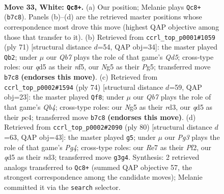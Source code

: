 \documentclass[11pt]{article}
\begin{document}
\clearpage

\begin{figure}[p]\centering
\begin{subfigure}{0.46\textwidth}\centering
\resizebox{\linewidth}{!}{%
\newchessgame
\chessboard[
  setfen={7k/1Q2R3/6p1/3q1pNp/3p3P/3P2P1/5P2/rN4K1 w - - 1 33},
  showmover=false,
  pgfstyle=straightmove, color=movearrow, markmove={b7-c8}
]}
\caption{}
\end{subfigure}\hfill
\begin{subfigure}{0.46\textwidth}\centering
\resizebox{\linewidth}{!}{%
\newchessgame
\chessboard[
  setfen={3r1k2/2p2p2/7p/p4NpP/P2q1nP1/5Q2/5P1K/4R3 b - - 1 36},
  showmover=false,
  pgfstyle=straightmove, color=movearrow, markmove={d4-b2}
]}
\caption{}
\end{subfigure}
\\[4pt]
\begin{subfigure}{0.46\textwidth}\centering
\resizebox{\linewidth}{!}{%
\newchessgame
\chessboard[
  setfen={8/1q5k/4p3/1N3p1n/PQp2P1p/3rP3/1P3K1P/6R1 w - - 6 38},
  showmover=false,
  pgfstyle=straightmove, color=movearrow, markmove={b4-f8}
]}
\caption{}
\end{subfigure}\hfill
\begin{subfigure}{0.46\textwidth}\centering
\resizebox{\linewidth}{!}{%
\newchessgame
\chessboard[
  setfen={7k/6p1/7p/pp1q4/4N1PP/P2n1Q2/5P1K/8 w - - 5 41},
  showmover=false,
  pgfstyle=straightmove, color=movearrow, markmove={g4-g5}
]}
\caption{}
\end{subfigure}
\caption{\textbf{Move 33, White: \texttt{Qc8+}.} (a) Our position; Melanie plays \texttt{Qc8+} (\texttt{b7c8}). Panels (b)--(d) are the retrieved master positions whose correspondence most drove this move (highest QAP objective among those that transfer to it). (b) Retrieved from \texttt{ccrl\_top\_p0001\#1059} (ply 71) [structural distance $d$=54, QAP obj=34]: the master played \texttt{Qb2}; under $\mu$ our \emph{Qb7} plays the role of that game's \emph{Qd5}; cross-type roles: our \emph{q}d5 as their \emph{n}f5, our \emph{N}g5 as their \emph{P}g5; transferred move \texttt{b7c8} \textbf{(endorses this move)}. (c) Retrieved from \texttt{ccrl\_top\_p0002\#1594} (ply 74) [structural distance $d$=59, QAP obj=23]: the master played \texttt{Qf8}; under $\mu$ our \emph{Qb7} plays the role of that game's \emph{Qb4}; cross-type roles: our \emph{N}g5 as their \emph{r}d3, our \emph{q}d5 as their \emph{p}c4; transferred move \texttt{b7c8} \textbf{(endorses this move)}. (d) Retrieved from \texttt{ccrl\_top\_p0002\#2090} (ply 80) [structural distance $d$=63, QAP obj=43]: the master played \texttt{g5}; under $\mu$ our \emph{Pg3} plays the role of that game's \emph{Pg4}; cross-type roles: our \emph{R}e7 as their \emph{P}f2, our \emph{q}d5 as their \emph{n}d3; transferred move \texttt{g3g4}. Synthesis: 2 retrieved analogs transferred to \texttt{Qc8+} (summed QAP objective 57, the strongest correspondence among the candidate moves); Melanie committed it via the \texttt{search} selector.}
\label{fig:thought-m64}
\end{figure}
\end{document}
